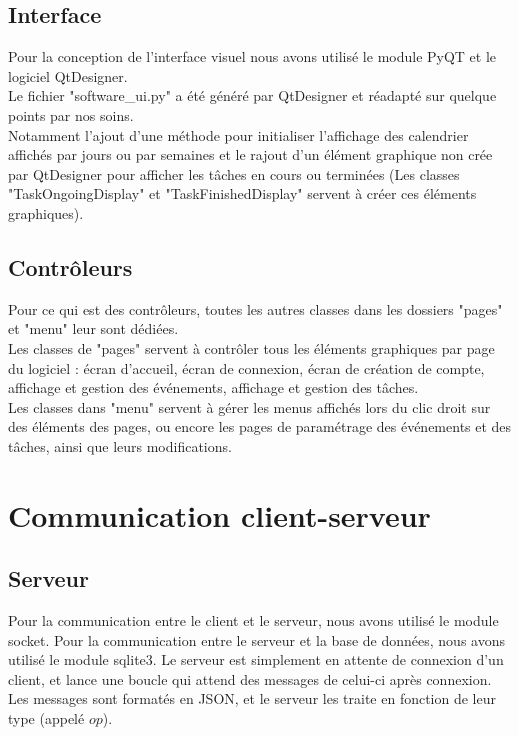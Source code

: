 \documentclass{article}
\begin{document}
\subsection{Interface}
Pour la conception de l'interface visuel nous avons utilisé le module PyQT et le logiciel QtDesigner.\\
Le fichier "software\_ui.py" a été généré par QtDesigner et réadapté sur quelque points par nos soins.\\
Notamment l’ajout d'une méthode pour initialiser l'affichage des calendrier affichés par jours ou par semaines et le rajout d'un élément graphique non crée par QtDesigner pour afficher les tâches en cours ou terminées (Les classes "TaskOngoingDisplay" et "TaskFinishedDisplay" servent à créer ces éléments graphiques).\\

\subsection{Contrôleurs}
Pour ce qui est des contrôleurs, toutes les autres classes dans les dossiers "pages" et "menu" leur sont dédiées.\\
Les classes de "pages" servent à contrôler tous les éléments graphiques par page du logiciel : écran d'accueil, écran de connexion, écran de création de compte, affichage et gestion des événements, affichage et gestion des tâches.\\
Les classes dans "menu" servent à gérer les menus affichés lors du clic droit sur des éléments des pages, ou encore les pages de paramétrage des événements et des tâches, ainsi que leurs modifications.\\

\newpage
\section{Communication client-serveur}
\subsection{Serveur}
Pour la communication entre le client et le serveur, nous avons utilisé le module socket.
Pour la communication entre le serveur et la base de données, nous avons utilisé le module sqlite3.
Le serveur est simplement en attente de connexion d'un client, et lance une boucle qui attend des messages de celui-ci après connexion.
Les messages sont formatés en JSON, et le serveur les traite en fonction de leur type (appelé $op$).
\\
\end{document}
